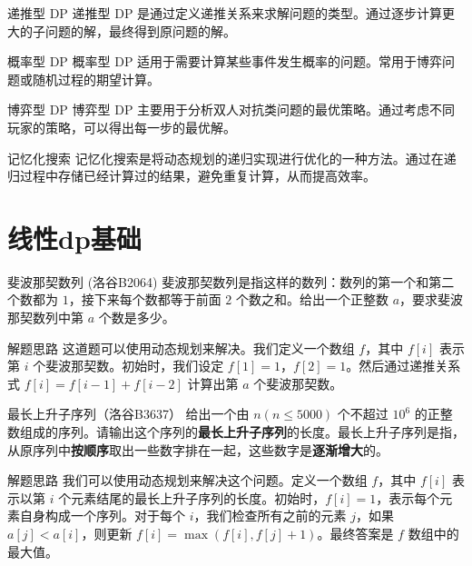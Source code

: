 \documentclass{beamer}
\begin{document}
\begin{frame}{递推型 DP}
    递推型 DP 是通过定义递推关系来求解问题的类型。通过逐步计算更大的子问题的解，最终得到原问题的解。
\end{frame}

\begin{frame}{概率型 DP}
    概率型 DP 适用于需要计算某些事件发生概率的问题。常用于博弈问题或随机过程的期望计算。
\end{frame}

\begin{frame}{博弈型 DP}
    博弈型 DP 主要用于分析双人对抗类问题的最优策略。通过考虑不同玩家的策略，可以得出每一步的最优解。
\end{frame}

\begin{frame}{记忆化搜索}
    记忆化搜索是将动态规划的递归实现进行优化的一种方法。通过在递归过程中存储已经计算过的结果，避免重复计算，从而提高效率。
\end{frame}

\section{线性dp基础}

\begin{frame}{斐波那契数列 (洛谷B2064)}
    斐波那契数列是指这样的数列：数列的第一个和第二个数都为 $1$，接下来每个数都等于前面 $2$ 个数之和。给出一个正整数 $a$，要求斐波那契数列中第 $a$ 个数是多少。
\end{frame}

\begin{frame}{解题思路}
    这道题可以使用动态规划来解决。我们定义一个数组 $f$，其中 $f[i]$ 表示第 $i$ 个斐波那契数。初始时，我们设定 $f[1] = 1$，$f[2] = 1$。然后通过递推关系式 $f[i] = f[i-1] + f[i-2]$ 计算出第 $a$ 个斐波那契数。
\end{frame}

\begin{frame}{最长上升子序列（洛谷B3637）}
    给出一个由 $n(n\le 5000)$ 个不超过 $10^6$ 的正整数组成的序列。请输出这个序列的\textbf{最长上升子序列}的长度。最长上升子序列是指，从原序列中\textbf{按顺序}取出一些数字排在一起，这些数字是\textbf{逐渐增大}的。
\end{frame}

\begin{frame}{解题思路}
    我们可以使用动态规划来解决这个问题。定义一个数组 $f$，其中 $f[i]$ 表示以第 $i$ 个元素结尾的最长上升子序列的长度。初始时，$f[i] = 1$，表示每个元素自身构成一个序列。对于每个 $i$，我们检查所有之前的元素 $j$，如果 $a[j] < a[i]$，则更新 $f[i] = \max(f[i], f[j] + 1)$。最终答案是 $f$ 数组中的最大值。
\end{frame}
\end{document}

